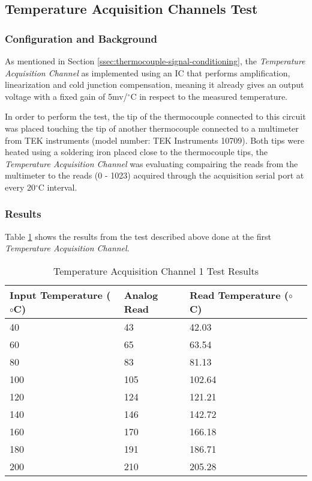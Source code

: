 \subsection{Temperature Acquisition Channels Test}\label{sec:temperature-acquisition-channels-test}
	
	\subsubsection{Configuration and Background}

		As mentioned in Section \ref{ssec:thermocouple-signal-conditioning}, the \textit{Temperature Acquisition Channel} as implemented using an IC that performs amplification, linearization and cold junction compensation, meaning it already gives an output voltage with a fixed gain of 5mv/$^{\circ}$C in respect to the measured temperature.
		\par
		In order to perform the test, the tip of the thermocouple connected to this circuit was placed touching the tip of another thermocouple connected to a multimeter from TEK instruments (model number: TEK Instruments 10709). Both tips were heated using a soldering iron placed close to the thermocouple tips, the \textit{Temperature Acquisition Channel} was evaluating compairing the reads from the multimeter to the reads (0 - 1023) acquired through the acquisition serial port at every 20$^{\circ}$C interval.

	\subsubsection{Results}


			Table \ref{table:results-temp1-test} shows the results from the test described above done at the first \textit{Temperature Acquisition Channel}.

				\begin{table}[h!]
				\centering
					\begin{tabular}{|l|l|l|l|}
						\hline
						\textbf{Input Temperature (${\circ}$C)} & \textbf{Analog Read} & \textbf{Read Temperature (${\circ}$C)} \\ \hline
						40 & 43 & 42.03 \\ \hline
						60 & 65 & 63.54 \\ \hline
						80 & 83 & 81.13 \\ \hline
						100 & 105 & 102.64 \\ \hline
						120 & 124 & 121.21 \\ \hline
						140 & 146 & 142.72 \\ \hline
						160 & 170 & 166.18 \\ \hline
						180 & 191 & 186.71 \\ \hline
						200 & 210 & 205.28 \\ \hline
					\end{tabular}
					\caption{Temperature Acquisition Channel 1 Test Results}
					\label{table:results-temp1-test}
				\end{table}

